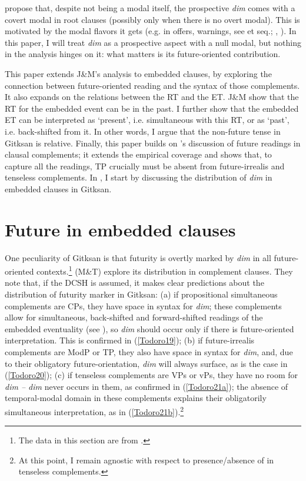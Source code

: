 \documentclass[output=paper]{langscibook}
\begin{document}
\begin{sloppypar}
\citet{todorovietal2020a} propose that, despite not being a modal itself, the prospective \textit{dim} comes with a covert modal in root clauses (possibly only when there is no overt modal). This is motivated by the modal flavors it gets (e.g. in offers, warnings, see \citealt{copley2009a} et seq.; \citealt{klechaetal2008a}, \citealt{klecha2011a}). In this paper, I will treat \emph{dim} as a prospective aspect with a null modal, but nothing in the analysis hinges on it: what matters is its future-oriented contribution. 
\end{sloppypar}

This paper extends J\&M’s analysis to embedded clauses, by exploring the connection between future-oriented reading and the syntax of those complements. It also expands on the relations between the RT and the ET. J\&M show that the RT for the embedded event can be in the past. I further show that the embedded ET can be interpreted as ‘present’, i.e. simultaneous with this RT, or as ‘past’, i.e. back-shifted from it. In other words, I argue that the non-future tense in Gitksan is relative. Finally, this paper builds on \citet{matthewson2018a}’s discussion of future readings in clausal complements; it extends the empirical coverage and shows that, to capture all the readings, TP crucially must be absent from future-irrealis and tenseless complements. In , I start by discussing the distribution of \emph{dim} in embedded clauses in Gitksan. 

\section{Future in embedded clauses}\label{Todoro:sect3}
\begin{sloppypar}
One peculiarity of Gitksan is that futurity is overtly marked by \emph{dim} in all future-oriented contexts.\footnote{The data in this section are from \citet{matthewson2018a}.} \citealt{matthewson2018a} (M\&T) explore its distribution in complement clauses. They note that, if the DCSH is assumed, it makes clear predictions about the distribution of futurity marker in Gitksan: (a) if propositional simultaneous complements are CPs, they have space in syntax for \emph{dim}; these complements allow for simultaneous, back-shifted and forward-shifted readings of the embedded eventuality (see ), so \emph{dim} should occur only if there is future-oriented interpretation. This is confirmed in (\ref{Todoro19}); (b) if future-irrealis complements are ModP or TP, they also have space in syntax for \emph{dim}, and, due to their obligatory future-orientation, \emph{dim} will always surface, as is the case in (\ref{Todoro20}); (c) if tenseless complements are VPs or vPs, they have no room for \emph{dim -- dim} never occurs in them, as confirmed in (\ref{Todoro21a}); the absence of temporal-modal domain in these complements explains their obligatorily simultaneous interpretation, as in (\ref{Todoro21b}).\footnote{At this point, I remain agnostic with respect to presence/absence of  in tenseless complements.}
\end{sloppypar}
\end{document}
